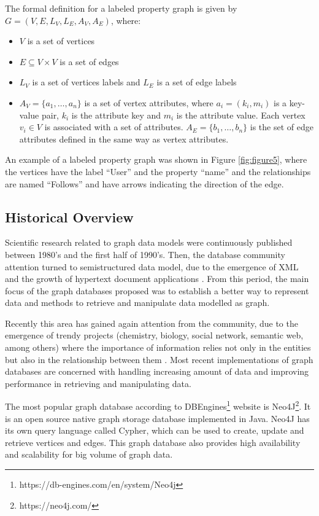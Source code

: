 The formal definition for a labeled property graph is given by $G = (V, E, L_V, L_E, A_V, A_E)$, where:
\begin{itemize}
\item $V$ is a set of vertices
\item $E \subseteq V \times V$ is a set of edges 
\item $L_V$ is a set of vertices labels and $L_E$ is a set of edge labels
\item $A_V = \{a_1, \dots, a_n\}$ is a set of vertex attributes, where $a_i = (k_i, m_i)$ is a key-value pair, $k_i$ is the attribute key and $m_i$ is the attribute value. Each vertex $v_i \in V$ is associated with a set of attributes. $A_E = \{b_1, \dots, b_n\}$ is the set of edge attributes defined in the same way as vertex attributes.
\end{itemize}

An example of a labeled property graph was shown in Figure \ref{fig:figure5}, where the vertices have the label ``User'' and the property ``name'' and the relationships are named ``Follows'' and have arrows indicating the direction of the edge.

\subsection{Historical Overview}

Scientific research related to graph data models were continuously published between 1980's and the first half of 1990's. Then, the database community attention turned to semistructured data model, due to the emergence of XML and the growth of hypertext document applications \cite{Angles2008}. From this period, the main focus of the graph databases proposed was to establish a better way to represent data and methods to retrieve and manipulate data modelled as graph.
 
Recently this area has gained again attention from the community, due to the emergence of trendy projects (chemistry, biology, social network, semantic web, among others) where the importance of information relies not only in the entities but also in the relationship between them \cite{Angles2012}. Most recent implementations of graph databases are concerned with handling increasing amount of data and improving performance in retrieving and manipulating data.
 
The most popular graph database according to DBEngines\footnote{https://db-engines.com/en/system/Neo4j} website is Neo4J\footnote{https://neo4j.com/}. It is an open source native graph storage database implemented in Java. Neo4J has its own query language called Cypher, which can be used to create, update and retrieve vertices and edges. This graph database also provides high availability and scalability for big volume of graph data.

